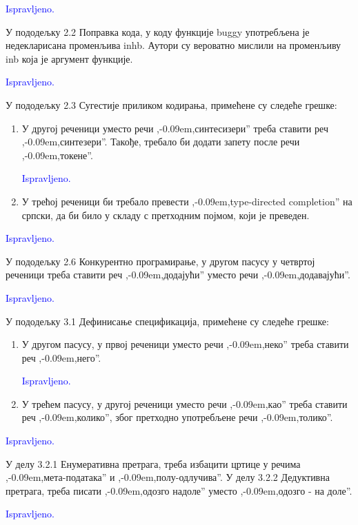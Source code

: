 \documentclass[a4paper]{report}
\newcommand{\odgovor}[1]{\textcolor{blue}{#1}}
\def\zn{,\kern-0.09em,}
\begin{document}
\odgovor{Ispravljeno.}

\par У пододељку 2.2 Поправка кода, у коду функције buggy употребљена је недекларисана променљива inhb. Аутори су вероватно мислили на променљиву inb која је аргумент функције.

\odgovor{Ispravljeno.}

\par У пододељку 2.3 Сугестије приликом кодирања, примећене су следеће грешке:
\begin{enumerate}
\item У другој реченици уместо речи \zn синтесизери'' треба ставити реч \zn синтезери''. Такође, требало би додати запету после речи \zn токене''.

\odgovor{Ispravljeno.}

\item У трећој реченици би требало превести \zn type-directed completion'' на српски, да би било у складу с претходним појмом, који је преведен.
\end{enumerate}

\odgovor{Ispravljeno.}

\par У пододељку 2.6 Конкурентно програмирање, у другом пасусу у четвртој реченици треба ставити реч \zn додајући'' уместо речи \zn додавајући''.

\odgovor{Ispravljeno.}


\par У пододељку 3.1 Дефинисање спецификација, примећене су следеће грешке:
\begin{enumerate}
\item У другом пасусу, у првој реченици уместо речи \zn неко'' треба ставити реч \zn него''.

\odgovor {Ispravljeno.}

\item У трећем пасусу, у другој реченици уместо речи \zn као'' треба ставити реч \zn колико'', због претходно употребљене речи \zn толико''.
\end{enumerate}

\odgovor {Ispravljeno.}

\par У делу 3.2.1 Енумеративна претрага, треба избацити цртице у речима \zn мета-података'' и \zn полу-одлучива''. У делу 3.2.2 Дедуктивна претрага, треба писати \zn одозго надоле'' уместо \zn одозго - на доле''.

\odgovor {Ispravljeno.}
\end{document}

